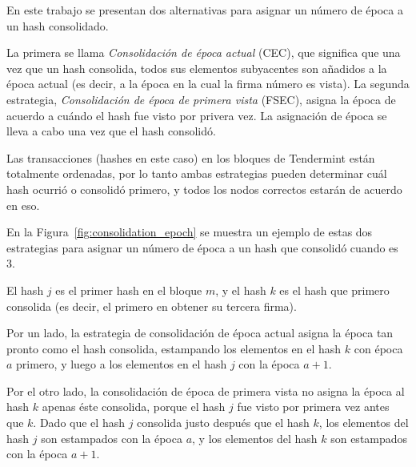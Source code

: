 %
%

%

En este trabajo se presentan dos alternativas para asignar un número de época a un hash consolidado.

%
La primera se llama \textit{Consolidación de época actual} (CEC), que significa que 
una vez que un hash consolida, todos sus elementos subyacentes son añadidos a la época actual
(es decir, a la época en la cual la firma número \SPH es vista).
%
La segunda estrategia, \textit{Consolidación de época de primera vista} (FSEC), asigna la época
de acuerdo a cuándo el hash fue visto por privera vez. La asignación de época se lleva
a cabo una vez que el hash consolidó. 

%
Las transacciones (hashes en este caso) en los bloques de Tendermint están totalmente ordenadas,
por lo tanto ambas estrategias pueden determinar cuál hash ocurrió o consolidó primero, y
todos los nodos correctos estarán de acuerdo en eso.

%

En la Figura~\ref{fig:consolidation_epoch} se muestra un ejemplo de estas dos estrategias para asignar
un número de época a un hash que consolidó cuando \SPH es 3.

%
El hash $j$ es el primer hash en el bloque $m$, y el hash $k$ es el hash que primero consolida
(es decir, el primero en obtener su tercera firma).

%
Por un lado, la estrategia de consolidación de época actual asigna la época tan pronto como
el hash consolida, estampando los elementos en el hash $k$ con época $a$ primero, y luego
a los elementos en el hash $j$ con la época $a+1$.

%
Por el otro lado, la consolidación de época de primera vista no asigna la época al hash $k$
apenas éste consolida, porque el hash $j$ fue visto por primera vez antes que $k$.
%
Dado que el hash $j$ consolida justo después que el hash $k$, los elementos del hash $j$ son
estampados
con la época $a$, y los elementos del hash $k$ son estampados con la época $a+1$. 


